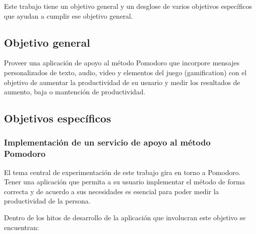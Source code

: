 \documentclass[12pt,letterpaper]{report}
\begin{document}
Este trabajo tiene un objetivo general y un desglose de varios objetivos específicos que ayudan a cumplir ese objetivo
general.

\subsection{Objetivo general}\label{objetivo-general}

Proveer una aplicación de apoyo al método Pomodoro que incorpore mensajes personalizados de texto, audio, video y
elementos del juego (gamification) con el objetivo de aumentar la productividad de su usuario y medir los resultados de
aumento, baja o mantención de productividad.

\subsection{Objetivos específicos}\label{objetivos-especificos}

\subsubsection{Implementación de un servicio de apoyo al método Pomodoro}\label{implementacion-de-un-servicio-de-apoyo-a-pomodoro}

El tema central de experimentación de este trabajo gira en torno a Pomodoro. Tener una aplicación que permita a su
usuario implementar el método de forma correcta y de acuerdo a sus necesidades es esencial para poder medir la
productividad de la persona.

Dentro de los hitos de desarrollo de la aplicación que involucran este objetivo se encuentran:
\end{document}
